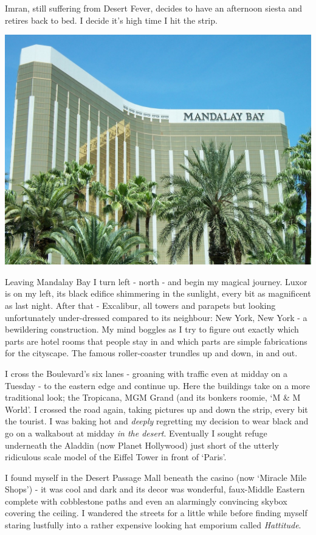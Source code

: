 \documentclass[a5paper,titlepage,11pt]{book}
\begin{document}
Imran, still suffering from Desert Fever, decides to have an afternoon siesta and retires back to bed.  I decide it's high time I hit the strip.

\begin{center}\includegraphics[width=\textwidth]{gfx/100_1388}\end{center}

Leaving Mandalay Bay I turn left - north - and begin my magical journey.  Luxor is on my left, its black edifice shimmering in the sunlight, every bit as magnificent as last night.  After that - Excalibur, all towers and parapets but looking unfortunately under-dressed compared to its neighbour: New York, New York - a bewildering construction.  My mind boggles as I try to figure out exactly which parts are hotel rooms that people stay in and which parts are simple fabrications for the cityscape.  The famous roller-coaster trundles up and down, in and out.

I cross the Boulevard's six lanes - groaning with traffic even at midday on a Tuesday - to the eastern edge and continue up. Here the buildings take on a more traditional look; the Tropicana, MGM Grand (and its bonkers roomie, `M \& M World'.  I crossed the road again, taking pictures up and down the strip, every bit the tourist.  I was baking hot and \emph{deeply} regretting my decision to wear black and go on a walkabout at midday \emph{in the desert}.  Eventually I sought refuge underneath the Aladdin (now Planet Hollywood) just short of the utterly ridiculous scale model of the Eiffel Tower in front of `Paris'.

I found myself in the Desert Passage Mall beneath the casino (now `Miracle Mile Shops') - it was cool and dark and its decor was wonderful, faux-Middle Eastern complete with cobblestone paths and even an alarmingly convincing skybox covering the ceiling.  I wandered the streets for a little while before finding myself staring lustfully into a rather expensive looking hat emporium called \emph{Hattitude}.
\end{document}
